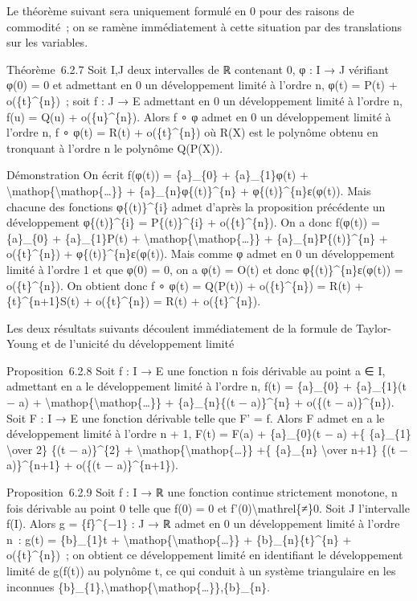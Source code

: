 \documentclass[]{article}
\begin{document}
Le théorème suivant sera uniquement formulé en 0 pour des raisons de
commodité~; on se ramène immédiatement à cette situation par des
translations sur les variables.

Théorème~6.2.7 Soit I,J deux intervalles de ℝ contenant 0, φ : I → J
vérifiant φ(0) = 0 et admettant en 0 un développement limité à l'ordre
n, φ(t) = P(t) + o(\{t\}\^{}\{n\})~; soit f : J → E admettant en 0 un
développement limité à l'ordre n, f(u) = Q(u) + o(\{u\}\^{}\{n\}). Alors
f ∘ φ admet en 0 un développement limité à l'ordre n, f ∘ φ(t) = R(t) +
o(\{t\}\^{}\{n\}) où R(X) est le polynôme obtenu en tronquant à l'ordre
n le polynôme Q(P(X)).

Démonstration On écrit f(φ(t)) = \{a\}\_\{0\} + \{a\}\_\{1\}φ(t) +
\textbackslash{}mathop\{\textbackslash{}mathop\{\ldots{}\}\} +
\{a\}\_\{n\}φ\{(t)\}\^{}\{n\} + φ\{(t)\}\^{}\{n\}ε(φ(t)). Mais chacune
des fonctions φ\{(t)\}\^{}\{i\} admet d'après la proposition précédente
un développement φ\{(t)\}\^{}\{i\} = P\{(t)\}\^{}\{i\} +
o(\{t\}\^{}\{n\}). On a donc f(φ(t)) = \{a\}\_\{0\} + \{a\}\_\{1\}P(t) +
\textbackslash{}mathop\{\textbackslash{}mathop\{\ldots{}\}\} +
\{a\}\_\{n\}P\{(t)\}\^{}\{n\} + o(\{t\}\^{}\{n\}) +
φ\{(t)\}\^{}\{n\}ε(φ(t)). Mais comme φ admet en 0 un développement
limité à l'ordre 1 et que φ(0) = 0, on a φ(t) = O(t) et donc
φ\{(t)\}\^{}\{n\}ε(φ(t)) = o(\{t\}\^{}\{n\}). On obtient donc f ∘ φ(t) =
Q(P(t)) + o(\{t\}\^{}\{n\}) = R(t) + \{t\}\^{}\{n+1\}S(t) +
o(\{t\}\^{}\{n\}) = R(t) + o(\{t\}\^{}\{n\}).

Les deux résultats suivants découlent immédiatement de la formule de
Taylor-Young et de l'unicité du développement limité

Proposition~6.2.8 Soit f : I → E une fonction n fois dérivable au point
a ∈ I, admettant en a le développement limité à l'ordre n, f(t) =
\{a\}\_\{0\} + \{a\}\_\{1\}(t − a) +
\textbackslash{}mathop\{\textbackslash{}mathop\{\ldots{}\}\} +
\{a\}\_\{n\}\{(t − a)\}\^{}\{n\} + o(\{(t − a)\}\^{}\{n\}). Soit F : I →
E une fonction dérivable telle que F' = f. Alors F admet en a le
développement limité à l'ordre n + 1, F(t) = F(a) + \{a\}\_\{0\}(t − a)
+\{ \{a\}\_\{1\} \textbackslash{}over 2\} \{(t − a)\}\^{}\{2\} +
\textbackslash{}mathop\{\textbackslash{}mathop\{\ldots{}\}\} +\{
\{a\}\_\{n\} \textbackslash{}over n+1\} \{(t − a)\}\^{}\{n+1\} + o(\{(t
− a)\}\^{}\{n+1\}).

Proposition~6.2.9 Soit f : I → ℝ une fonction continue strictement
monotone, n fois dérivable au point 0 telle que f(0) = 0 et
f'(0)\textbackslash{}mathrel\{≠\}0. Soit J l'intervalle f(I). Alors g =
\{f\}\^{}\{−1\} : J → ℝ admet en 0 un développement limité à l'ordre n~:
g(t) = \{b\}\_\{1\}t +
\textbackslash{}mathop\{\textbackslash{}mathop\{\ldots{}\}\} +
\{b\}\_\{n\}\{t\}\^{}\{n\} + o(\{t\}\^{}\{n\})~; on obtient ce
développement limité en identifiant le développement limité de g(f(t))
au polynôme t, ce qui conduit à un système triangulaire en les inconnues
\{b\}\_\{1\},\textbackslash{}mathop\{\textbackslash{}mathop\{\ldots{}\}\},\{b\}\_\{n\}.
\end{document}
